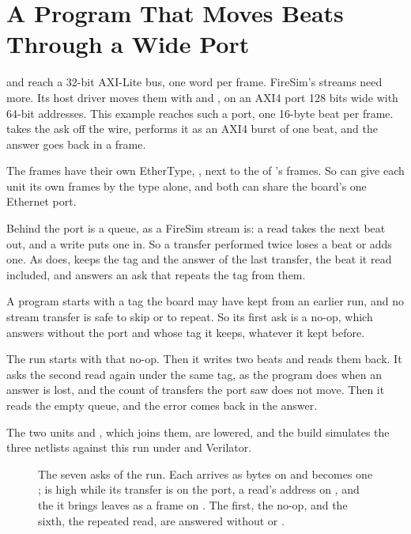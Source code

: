 \section{A Program That Moves Beats Through a Wide Port}
\label{sec:x-stream}

 and  reach a 32-bit AXI-Lite bus, one
word per frame. FireSim's streams need more. Its host driver moves
them with  and
, on an AXI4 port 128 bits wide with
64-bit addresses. This example reaches such a port, one 16-byte beat
per frame.  takes the ask off the wire,
 performs it as an AXI4 burst of one beat, and the
answer goes back in a frame.

The frames have their own EtherType, , next to the
 of 's frames. So  can give
each unit its own frames by the type alone, and both can share the
board's one Ethernet port.

Behind the port is a queue, as a FireSim stream is: a read takes the
next beat out, and a write puts one in. So a transfer performed twice
loses a beat or adds one. As  does, 
keeps the tag and the answer of the last transfer, the beat it read
included, and answers an ask that repeats the tag from them.

A program starts with a tag the board may have kept from an earlier
run, and no stream transfer is safe to skip or to repeat. So its
first ask is a no-op, which  answers without the
port and whose tag it keeps, whatever it kept before.

The run starts with that no-op. Then it writes two beats and reads
them back. It asks the second read
again under the same tag, as the program does when an answer is lost,
and the count of transfers the port saw does not move. Then it reads
the empty queue, and the error comes back in the answer.

The two units and , which joins them, are lowered,
and the build simulates the three netlists against this run under
 and Verilator.

\begin{figure}[htbp]
\centering

\caption{The seven asks of the run. Each arrives as bytes on 
and becomes one ;  is high while its transfer is
on the port, a read's address on , and the  it
brings leaves as a frame on . The first, the no-op, and the
sixth, the repeated read, are answered without  or
.}
\label{fig:x-stream}
\end{figure}




